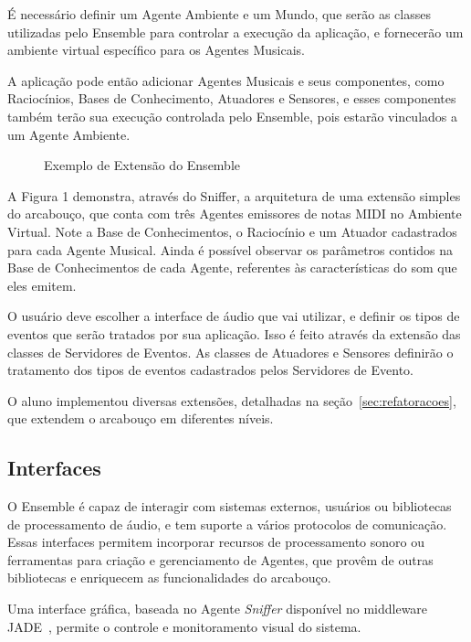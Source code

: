 \documentclass[a4paper, 11pt, twoside]{article}
\begin{document}
\begin{multicols}{2}
É necessário definir um Agente Ambiente e um Mundo, que serão as classes
utilizadas pelo Ensemble para controlar a execução da aplicação,
e fornecerão um ambiente virtual específico para os Agentes Musicais.

A aplicação pode então adicionar Agentes Musicais e seus componentes, 
como Raciocínios, Bases de Conhecimento, Atuadores e Sensores, e esses
componentes também terão sua execução controlada pelo Ensemble, pois
estarão vinculados a um Agente Ambiente.

\begin{figure}[H]
  \centering
  \caption{Exemplo de Extensão do Ensemble}
  \label{fig2}
\end{figure}

A Figura 1 demonstra, através do Sniffer, a arquitetura de uma extensão simples
do arcabouço, que conta com três Agentes emissores de notas
MIDI no Ambiente Virtual. Note a Base de Conhecimentos, 
o Raciocínio e um Atuador cadastrados
para cada Agente Musical. Ainda é possível observar os
parâmetros contidos na Base de Conhecimentos de cada
Agente, referentes às características do som que eles emitem.

O usuário deve escolher a interface de áudio que vai utilizar,
e definir os tipos de eventos que serão tratados por sua aplicação.
Isso é feito através da extensão das classes de Servidores de Eventos.
As classes de Atuadores e Sensores definirão o tratamento dos tipos
de eventos cadastrados pelos Servidores de Evento.

O aluno implementou diversas extensões, detalhadas na seção~\ref{sec:refatoracoes},  que extendem
o arcabouço em diferentes níveis. 

\subsection{Interfaces}

O Ensemble é capaz de interagir com sistemas externos, usuários ou 
bibliotecas de processamento de áudio, e tem suporte a vários protocolos de 
comunicação. Essas interfaces permitem incorporar recursos de processamento sonoro 
ou ferramentas para criação e gerenciamento de Agentes, que provêm de outras 
bibliotecas e enriquecem as funcionalidades do arcabouço.

Uma interface gráfica, baseada no Agente \textit{Sniffer} disponível no middleware 
JADE~\cite{belli99}, permite o controle e monitoramento visual do sistema.


\end{multicols}
\end{document}
